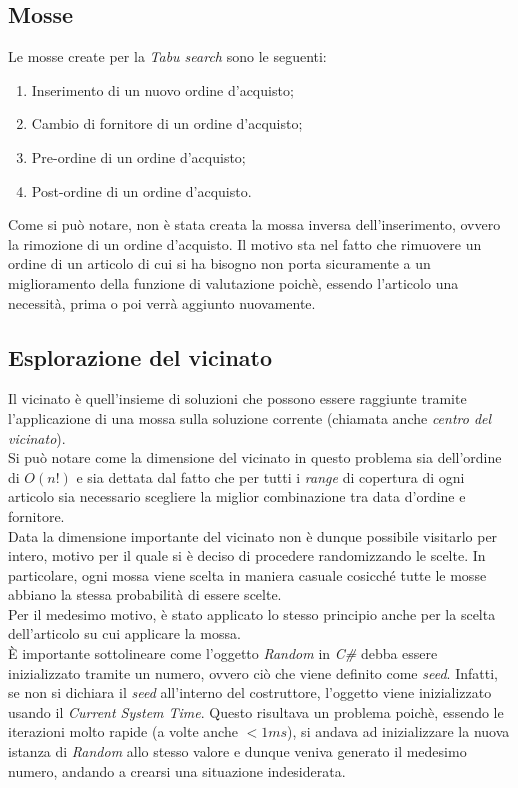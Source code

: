 \subsection{Mosse}
\label{sec:mosse}
\noindent Le mosse create per la \textit{Tabu search} sono le seguenti:
\begin{enumerate}
    \item Inserimento di un nuovo ordine d'acquisto;
    \item Cambio di fornitore di un ordine d'acquisto;
    \item Pre-ordine di un ordine d'acquisto;
    \item Post-ordine di un ordine d'acquisto.
\end{enumerate}
Come si può notare, non è stata creata la mossa inversa dell'inserimento, ovvero la rimozione di un ordine d'acquisto.
Il motivo sta nel fatto che rimuovere un ordine di un articolo di cui si ha bisogno non porta sicuramente a un miglioramento
della funzione di valutazione poichè, essendo l'articolo una necessità, prima o poi verrà aggiunto nuovamente.

\subsection{Esplorazione del vicinato}
\label{sec:esplorazione-vicinato}
\noindent Il vicinato è quell'insieme di soluzioni che possono essere raggiunte
tramite l'applicazione di una mossa sulla soluzione corrente (chiamata anche \textit{centro del vicinato}).\\
Si può notare come la dimensione del vicinato in questo problema sia dell'ordine di $O(n!)$ e sia dettata dal fatto che
per tutti i \textit{range} di copertura di ogni articolo sia necessario scegliere la miglior
combinazione tra data d'ordine e fornitore.\\
Data la dimensione importante del vicinato non è dunque possibile visitarlo per intero,
motivo per il quale si è deciso di procedere randomizzando le scelte.
In particolare, ogni mossa viene scelta in maniera casuale cosicché tutte le mosse
abbiano la stessa probabilità di essere scelte.\\
Per il medesimo motivo, è stato applicato lo stesso principio anche per la scelta dell'articolo su cui applicare
la mossa.\\
È importante sottolineare come l'oggetto \textit{Random} in \textit{C\#}
debba essere inizializzato tramite un numero, ovvero
ciò che viene definito come \textit{seed}. Infatti, se non si dichiara
il \textit{seed} all'interno del costruttore, l'oggetto viene inizializzato usando il
\textit{Current System Time}. Questo risultava un problema poichè, essendo le
iterazioni molto rapide (a volte anche $<1ms$), si andava ad inizializzare la nuova istanza
di \textit{Random} allo stesso valore e dunque veniva generato il medesimo
numero, andando a crearsi una situazione indesiderata.


